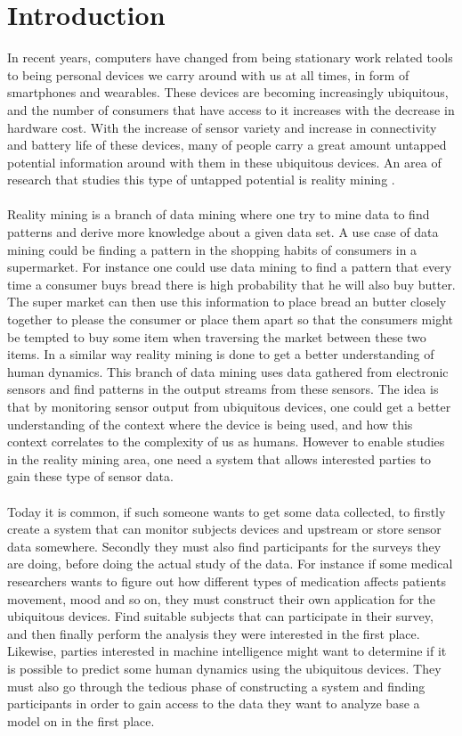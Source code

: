 \chapter{Introduction}
\label{cha:introduction}

In recent years, computers have changed from being stationary work related tools to being personal devices we carry around with us at all times, in form of smartphones and wearables. These devices are becoming increasingly ubiquitous, and the number of consumers that have access to it increases with the decrease in hardware cost. With the increase of sensor variety and increase in connectivity and battery life of these devices, many of people carry a great amount untapped potential information around with them in these ubiquitous devices.  An area of research that studies this type of untapped potential is reality mining \parencite{eagle2006_reality_mining_definition}.
\\\\
Reality mining is a branch of data mining where one try to mine data to find patterns and derive more knowledge about a given data set. A use case of data mining could be finding a pattern in the shopping habits of consumers in a supermarket. For instance one could use data mining to find a pattern that every time a consumer buys bread there is high probability that he will also buy butter. The super market can then use this information to place bread an butter closely together to please the consumer or place them apart so that the consumers might be tempted to buy some item when traversing the market between these two items. In a similar way reality mining is done to get a better understanding of human dynamics. This branch of data mining uses data gathered from electronic sensors and find patterns in the output streams from these sensors. The idea is that by monitoring sensor output from ubiquitous devices, one could get a better understanding of the context where the device is being used, and how this context correlates to the complexity of us as humans. However to enable studies in the reality mining area, one need a system that allows interested parties to gain these type of sensor data. 
\\\\
Today it is common, if such someone wants to get some data collected, to firstly create a system that can monitor subjects devices and upstream or store sensor data somewhere. Secondly they must also find participants for the surveys they are doing, before doing the actual study of the data. For instance if some medical researchers wants to figure out how different types of medication affects patients movement, mood and so on, they must construct their own application for the ubiquitous devices. Find suitable subjects that can participate in their survey, and then finally perform the analysis they were interested in the first place. Likewise, parties interested in machine intelligence might want to determine if it is possible to predict some human dynamics using the ubiquitous devices. They must also go through the tedious phase of constructing a system and finding participants in order to gain access to the data they want to analyze base a model on in the first place.
